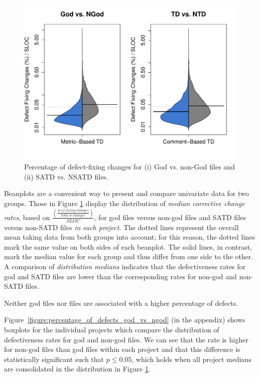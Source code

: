 \begin{figure}[h]
	\centering
	\includegraphics[width=140mm]{figures/chapter4/rq1_defectivness_distrubution_new}
	\caption{Percentage of defect-fixing changes for (i) God vs. non-God files and (ii) SATD vs. NSATD files.}
	\label{figure:ch4_number_of_fixing_changes_TD_vs_NTD}
\end{figure}

Beanplots are a convenient way to present and compare univariate data for two groups. Those in Figure \ref{figure:ch4_number_of_fixing_changes_TD_vs_NTD} display the distribution of \textit{median corrective change rates}, based on $\frac{\left (\frac{\#~of~fixing~changes}{total~\#~changes} \right )}{SLOC}$, for god files versus non-god files and SATD files versus non-SATD files \textit{in each project}. %
The dotted lines represent the overall mean taking data from both groups into account; for this reason, the dotted lines mark the same value on both sides of each beanplot. The solid lines, in contrast, mark the median value for each group and thus differ from one side to the other. A comparison of \textit{distribution medians} indicates that the defectiveness rates for god and SATD files are lower than the corresponding rates for non-god and non-SATD files.

\begin{myboxii}
	Neither god files nor \SATD files are associated with a higher percentage of defects.
\end{myboxii}

Figure~\ref{figure:percentage_of_defects_god_vs_ngod} (in the appendix) shows boxplots for the individual projects which compare the distribution of defectiveness rates for god and non-god files. We can see that the rate is higher for non-god files than god files within each project and that this difference is statistically significant such that $p \le 0.05$, which holds when all project medians are consolidated in the distribution in Figure \ref{figure:ch4_number_of_fixing_changes_TD_vs_NTD}.

